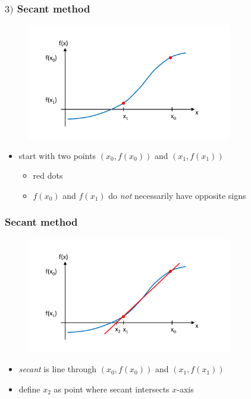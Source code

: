 \documentclass[english,14pt]{beamer}
\newcommand\red[1]{{\color{red} #1}}
\begin{document}
\begin{frame}[fragile]

\frametitle{$3)$ Secant method}

\vspace*{-15mm}
\begin{figure}[ht]
	\centering
	\includegraphics[width=0.8\textwidth]{figures/secant1}
\end{figure}
\vspace*{-10mm}
\begin{itemize}
	\item start with two points $(x_0,f(x_0))$ and $(x_1,f(x_1))$
	\begin{itemize}
		\item \red{red dots}
		\item $f(x_0)$ and $f(x_1)$ do \emph{not} necessarily have opposite signs
	\end{itemize}
\end{itemize}

\end{frame}


\begin{frame}[fragile]

\frametitle{Secant method}

\vspace*{-15mm}
\begin{figure}[ht]
	\centering
	\includegraphics[width=0.8\textwidth]{figures/secant2}
\end{figure}
\vspace*{-10mm}
\begin{itemize}
	\item \emph{\red{secant}} is line through $(x_0,f(x_0))$ and $(x_1,f(x_1))$
	\item define $x_2$ as point where secant intersects $x$-axis
\end{itemize}

\end{frame}
\end{document}
